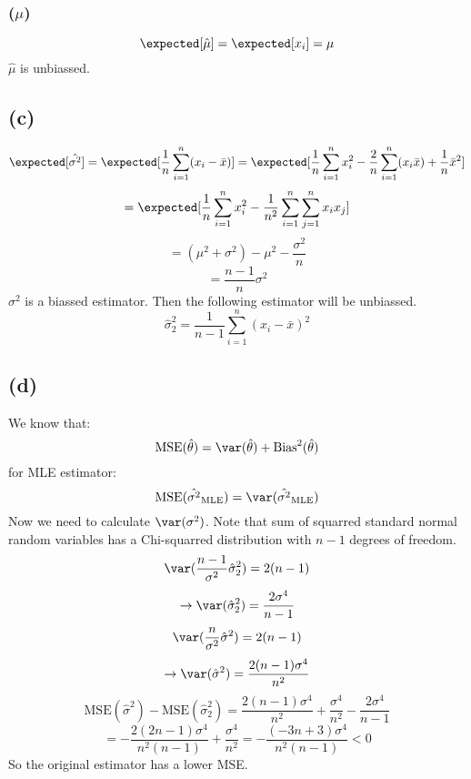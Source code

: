 \subsubsection{($\mu$)}
$$
\expected[\hat{\mu}] = \expected[x_i] = \mu
$$
$\hat{\mu}$ is unbiassed.

\subsection{(c)}
$$
\expected[\hat{\sigma^2}] = \expected[\frac{1}{n}\sum_{i = 1}^n(x_i - \bar{x})] = \expected[\frac{1}{n}\sum_{i = 1}^nx_i^2 - \frac{2}{n}\sum_{i = 1}^n(x_i\bar{x}) + \frac{1}{n}\bar{x}^2]
$$
$$
= \expected[\frac{1}{n}\sum_{i = 1}^nx_i^2 - \frac{1}{n^2}\sum_{i = 1}^n\sum_{j = 1}^nx_ix_j]
$$
$$
= (\mu^2 + \sigma^2) -\mu^2 -  \frac{\sigma^2}{n}
$$
$$
= \frac{n - 1}{n}\sigma^2
$$
$\sigma^2$ is a biassed estimator. 
Then the following estimator will be unbiassed.
$$
\hat{\sigma}^2_2 = \frac{1}{n - 1}\sum_{i = 1}^n(x_i - \bar{x})^2
$$
\subsection{(d)}
We know that:
$$
\text{MSE}(\hat{\theta}) = \var(\hat{\theta}) + \text{Bias}^2(\hat{\theta})
$$
for MLE estimator:
$$
\text{MSE}(\hat{\sigma^2}_{\text{MLE}}) = \var(\hat{\sigma^2}_{\text{MLE}})
$$
Now we need to calculate $\var(\sigma^2)$. Note that sum of squarred standard normal random variables has a Chi-squarred distribution with $n-1$ 
degrees of freedom.
$$
\var(\frac{n - 1}{\sigma^2}\hat{\sigma}^2_2) = 2(n - 1)
$$
$$
\rightarrow\var(\hat{\sigma}^2_2) = \frac{2\sigma^4}{n - 1}
$$
$$
\var(\frac{n}{\sigma^2}\hat{\sigma}^2) = 2(n - 1)
$$
$$
\rightarrow\var(\hat{\sigma}^2) = \frac{2(n - 1)\sigma^4}{n^2}
$$
$$
\text{MSE}(\hat{\sigma}^2) - \text{MSE}(\hat{\sigma}^2_2) = \frac{2(n - 1)\sigma^4}{n^2} + \frac{\sigma^4}{n^2} - \frac{2\sigma^4}{n - 1}
$$
$$
= -\frac{2(2n - 1)\sigma^4}{n^2(n - 1)} + \frac{\sigma^4}{n^2} = -\frac{(-3n +3)\sigma^4}{n^2(n - 1)} < 0
$$
So the original estimator has a lower MSE.